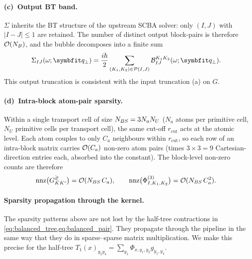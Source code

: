 \paragraph{(c)~Output BT band.} $\Sigma$ inherits the BT structure of
the upstream SCBA solver: only $(I,J)$ with $|I-J|\le 1$ are
retained. The number of distinct output block-pairs is therefore
$\mathcal{O}(N_{B})$, and the bubble decomposes into a finite sum
\begin{equation}\label{eq:sigma_block_sum}
  \Sigma_{IJ}(\omega;\qp)
  = \frac{i\hbar}{2}
    \sum_{(K_1,K_2)\in\mathcal{P}(I,J)}
      \mathcal{B}_{IJ}^{K_1K_2}(\omega;\qp).
\end{equation}
This output truncation is consistent with the input truncation (a)
on $G$.

\paragraph{(d)~Intra-block atom-pair sparsity.} Within a single
transport cell of size $N_{BS} = 3 N_a N_U$ ($N_a$ atoms per primitive
cell, $N_U$ primitive cells per transport cell), the same cut-off
$r_{\mathrm{cut}}$ acts at the atomic level. Each atom couples to only
$C_a$ neighbours within $r_{\mathrm{cut}}$, so each row of an
intra-block matrix carries $\mathcal{O}(C_a)$ non-zero atom pairs
(times $3\times 3 = 9$ Cartesian-direction entries each, absorbed
into the constant). The block-level non-zero counts are therefore
\begin{equation}\label{eq:phph_intra_block_nnz}
  \mathrm{nnz}\bigl(G^{\gtrless}_{KK'}\bigr) = \mathcal{O}(N_{BS}\,C_a),
  \qquad
  \mathrm{nnz}\bigl(\Phi^{(3)}_{I,K_1,K_2}\bigr) = \mathcal{O}(N_{BS}\,C_a^{2}).
\end{equation}

\paragraph{Sparsity propagation through the kernel.} The sparsity
patterns above are not lost by the half-tree contractions in
\cref{eq:balanced_tree,eq:balanced_pair}. They propagate
through the pipeline in the same way that they do in
sparse--sparse matrix multiplication. We make this precise for the
half-tree $T_1(x)_{y_2y_4} = \sum_{y_1}\Phi_{x,y_1,y_2}g_{y_1,y_4}$.

